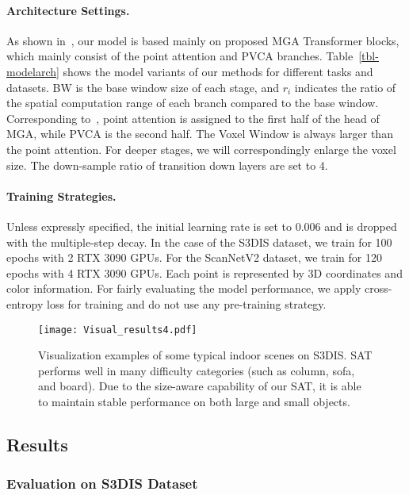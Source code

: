\documentclass[10pt,twocolumn,letterpaper]{article}
\begin{document}
\paragraph{Architecture Settings.} As shown in~, our model is based mainly on proposed MGA Transformer blocks, which mainly consist of the point attention and PVCA branches. Table~\ref{tbl-modelarch} shows the model variants of our methods for different tasks and datasets. BW is the base window size of each stage, and $r_i$ indicates the ratio of the spatial computation range of each branch compared to the base window. Corresponding to~, point attention is assigned to the first half of the head of MGA, while PVCA is the second half. The Voxel Window is always larger than the point attention. For deeper stages, we will correspondingly enlarge the voxel size. The down-sample ratio of transition down layers are set to 4.

\paragraph{Training Strategies.} Unless expressly specified, the initial learning rate is set to 0.006 and is dropped with the multiple-step decay. In the case of the S3DIS dataset, we train for 100 epochs with 2 RTX 3090 GPUs. For the ScanNetV2 dataset, we train for 120 epochs with 4 RTX 3090 GPUs. Each point is represented by 3D coordinates and color information. For fairly evaluating the model performance, we apply cross-entropy loss for training and do not use any pre-training strategy.








\begin{figure*}
\centering
\texttt{[image: Visual\_results4.pdf]}
\caption{Visualization examples of some typical indoor scenes on S3DIS. SAT performs well in many difficulty categories (such as column, sofa, and board). Due to the size-aware capability of our SAT, it is able to maintain stable performance on both large and small objects.}
\label{Fig-vis-s3dis}
\end{figure*}

\subsection{Results}\label{sec-4.2}
\subsubsection{Evaluation on S3DIS Dataset}
\end{document}
